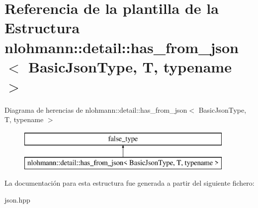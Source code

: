 \hypertarget{structnlohmann_1_1detail_1_1has__from__json}{}\section{Referencia de la plantilla de la Estructura nlohmann\+:\+:detail\+:\+:has\+\_\+from\+\_\+json$<$ Basic\+Json\+Type, T, typename $>$}
\label{structnlohmann_1_1detail_1_1has__from__json}
Diagrama de herencias de nlohmann\+:\+:detail\+:\+:has\+\_\+from\+\_\+json$<$ Basic\+Json\+Type, T, typename $>$\begin{figure}[H]
\begin{center}
\leavevmode
\includegraphics[height=2.000000cm]{structnlohmann_1_1detail_1_1has__from__json}
\end{center}
\end{figure}


La documentación para esta estructura fue generada a partir del siguiente fichero\+:\begin{DoxyCompactItemize}
\item 
json.\+hpp\end{DoxyCompactItemize}
